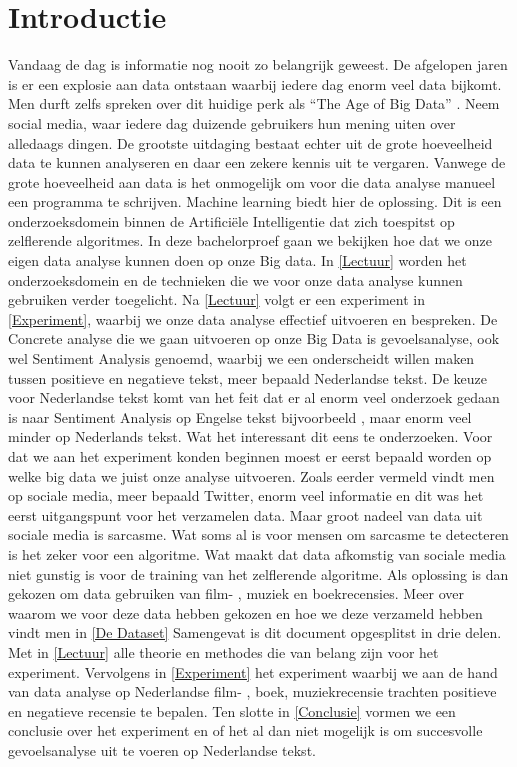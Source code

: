 \chapter{Introductie}\label{introductie}
Vandaag de dag is informatie nog nooit zo belangrijk geweest. De afgelopen jaren is er een explosie aan data ontstaan waarbij iedere dag enorm veel data bijkomt. Men durft zelfs spreken over dit huidige perk als ``The Age of Big Data'' \cite{lohr2012age}. Neem social media, waar iedere dag duizende gebruikers hun mening uiten over alledaags dingen. De grootste uitdaging bestaat echter uit de grote hoeveelheid data te kunnen analyseren en daar een zekere kennis uit te vergaren. Vanwege de grote hoeveelheid aan data is het onmogelijk om voor die data analyse  manueel een programma te schrijven. Machine learning biedt hier de oplossing. Dit is een onderzoeksdomein binnen de Artifici\"ele Intelligentie dat zich toespitst op zelflerende algoritmes. In deze bachelorproef gaan we bekijken hoe dat we onze eigen data analyse kunnen doen op onze Big data. In \ref{Lectuur} worden het onderzoeksdomein en de technieken die we voor onze data analyse kunnen gebruiken verder toegelicht. Na \ref{Lectuur} volgt er een experiment in \ref{Experiment}, waarbij we onze data analyse effectief uitvoeren en bespreken.
\newline
De Concrete analyse die we gaan uitvoeren op onze Big Data is gevoelsanalyse, ook wel Sentiment Analysis genoemd, waarbij we een onderscheidt willen maken tussen positieve en negatieve tekst, meer bepaald Nederlandse tekst. De keuze voor Nederlandse tekst komt van het feit dat er al enorm veel onderzoek gedaan is naar Sentiment Analysis op Engelse tekst bijvoorbeeld \cite{pang2008opinion} , maar enorm veel minder op Nederlands tekst. Wat het interessant dit eens te onderzoeken. 
\newline
Voor dat we aan het experiment konden beginnen moest er eerst bepaald worden op welke big data we juist onze analyse uitvoeren. Zoals eerder vermeld vindt men op sociale media, meer bepaald Twitter, enorm veel informatie en dit was het eerst uitgangspunt voor het verzamelen data. Maar groot nadeel van data uit sociale media is sarcasme. Wat soms al is voor mensen om sarcasme te detecteren is het zeker voor een algoritme. Wat maakt dat data afkomstig van sociale media niet gunstig is voor de training van het zelflerende algoritme. Als oplossing is dan gekozen om data gebruiken van film- , muziek en boekrecensies. Meer over waarom we voor deze data hebben gekozen en hoe we deze verzameld hebben vindt men in \ref{De Dataset}
\newline
Samengevat is dit document opgesplitst in drie delen. Met in \ref{Lectuur} alle theorie en methodes die van belang zijn voor het experiment. Vervolgens in \ref{Experiment} het experiment waarbij we aan de hand van data analyse op Nederlandse film- , boek, muziekrecensie trachten positieve en negatieve recensie te bepalen. Ten slotte in \ref{Conclusie} vormen we een conclusie over het experiment en of het al dan niet mogelijk is om succesvolle gevoelsanalyse uit te voeren op Nederlandse tekst.